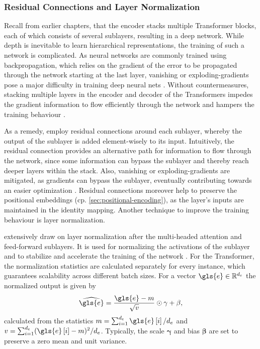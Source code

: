 \subsubsection{Residual Connections and Layer Normalization}\label{sec:residual-connections-layer-norm}

Recall from earlier chapters, that the encoder stacks multiple Transformer blocks, each of which consists of several sublayers, resulting in a deep network. While depth is inevitable to learn hierarchical representations, the training of such a network is complicated. As neural networks are commonly trained using backpropagation, which relies on the gradient of the error to be propagated through the network starting at the last layer, vanishing or \glspl{exploding-gradient} pose a major difficulty in training deep neural nets \autocite[][1]{heDeepResidualLearning2015}. Without countermeasures, stacking multiple layers in the encoder and decoder of the Transformers impedes the gradient information to flow efficiently through the network and hampers the training behaviour \autocite[][1811]{wangLearningDeepTransformer2019}.

As a remedy, \textcite[][3]{vaswaniAttentionAllYou2017} employ residual connections around each sublayer, whereby the output of the sublayer is added element-wisely to its input. Intuitively, the residual connection provides an alternative path for information to flow through the network, since some information can bypass the sublayer and thereby reach deeper layers within the stack. Also, vanishing or \glspl{exploding-gradient} are mitigated, as gradients can bypass the sublayer, eventually contributing towards an easier optimization \autocite[][3591]{liuRethinkingSkipConnection2020}. Residual connections moreover help to preserve the positional embeddings (cp. \cref{sec:positional-encoding}), as the layer's inputs are maintained in the identity mapping. Another technique to improve the training behaviour is layer normalization.

\textcite[][3]{vaswaniAttentionAllYou2017} extensively draw on layer normalization \autocite[][4]{baLayerNormalization2016} after the multi-headed attention and feed-forward sublayers. It is used for normalizing the activations of the sublayer and to stabilize and accelerate the training of the network \autocite[][2]{baLayerNormalization2016}. For the Transformer, the normalization statistics are calculated separately for every instance, which guarantees scalability across different batch sizes. For a vector $\gls{e}\in \mathbb{R}^{d_e}$ the normalized output is given by
\begin{equation}
    \widehat{\gls{e}}=\frac{\gls{e}-m}{\sqrt{v}} \odot \mathbf{\gamma}+\mathbf{\beta},
\end{equation}
calculated from the statistics $m = \sum_{i=1}^{d_{e}} \gls{e}\left[i\right] / d_{e}$ and $v = \sum_{i=1}^{d_{e}}(\gls{e}\left[i\right]-m)^2 / d_{e}$. Typically, the scale $\mathbf{\gamma}$ and bias $\mathbf{\beta}$ are set to preserve a zero mean and unit variance.

